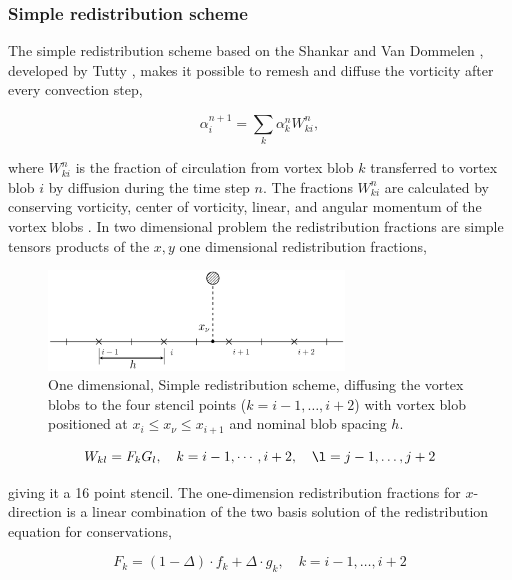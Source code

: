\subsubsection*{Simple redistribution scheme}

The simple redistribution scheme based on the Shankar and Van Dommelen \cite{Shankar1996}, developed by Tutty \cite{2010arXiv1009.0166T}, makes it possible to remesh and diffuse the vorticity after every convection step, 

	\begin{equation}
	\alpha_i^{n+1} = \sum_k \alpha_k^n W_{ki}^n, 
	\end{equation}

where $W_{ki}^n$ is the fraction of circulation from vortex blob $k$ transferred to vortex blob $i$ by diffusion during the time step $n$. The fractions $W_{ki}^n$ are calculated by conserving vorticity, center of vorticity, linear, and angular momentum of the vortex blobs \cite{2010arXiv1009.0166T}. In two dimensional problem the redistribution fractions are simple tensors products of the $x,y$ one dimensional redistribution fractions,


	\begin{figure}[t]
	\centering
	\includegraphics[width=0.7\textwidth]{figures/lagrangian/simpleRedistribution.pdf}
	\caption{One dimensional, Simple redistribution scheme, diffusing the vortex blobs to the four stencil points ($k=i-1,\dots,i+2$) with vortex blob positioned at $x_i \le x_{\nu} \le x_{i+1}$ and nominal blob spacing $h$.}
	\label{fig:simpleRedistribution}
	\end{figure}

	\begin{equation}
	W_{kl} = F_k G_l, \quad k = i-1,\cdots,i+2, \quad \l = j-1,\dots,j+2
	\end{equation}

giving it a 16 point stencil. The one-dimension redistribution fractions for $x$-direction is a linear combination of the two basis solution of the redistribution equation for conservations,

	\begin{equation}
	F_k = \left(1-\Delta\right)\cdot f_k + \Delta\cdot g_k, \quad k = i-1,\dots,i+2
	\end{equation}

